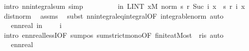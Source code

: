 \begin{isabellebody}
\ {\isacharparenleft}{\kern0pt}intro\ nn{\isacharunderscore}{\kern0pt}integral{\isacharunderscore}{\kern0pt}sum{\isacharcomma}{\kern0pt}\ simp{\isacharparenright}{\kern0pt}\isanewline
\ \ \ \ \isamarkupfalse%
\ \isamarkupfalse%
\ {\isachardoublequoteopen}{\isachardot}{\kern0pt}{\isachardot}{\kern0pt}{\isachardot}{\kern0pt}\ {\isacharequal}{\kern0pt}\ {\isacharparenleft}{\kern0pt}{\isasymSum}i{\isasymle}n{\isachardot}{\kern0pt}\ LINT\ x{\isacharbar}{\kern0pt}M{\isachardot}{\kern0pt}\ norm\ {\isacharparenleft}{\kern0pt}s\ {\isacharparenleft}{\kern0pt}r\ {\isacharparenleft}{\kern0pt}Suc\ i{\isacharparenright}{\kern0pt}{\isacharparenright}{\kern0pt}\ x\ {\isacharminus}{\kern0pt}\ s\ {\isacharparenleft}{\kern0pt}r\ i{\isacharparenright}{\kern0pt}\ x{\isacharparenright}{\kern0pt}{\isacharparenright}{\kern0pt}{\isachardoublequoteclose}\ \isamarkupfalse%
\ dist{\isacharunderscore}{\kern0pt}norm\ \isamarkupfalse%
\ assms{\isacharparenleft}{\kern0pt}{}{\isacharparenright}{\kern0pt}\ \isamarkupfalse%
\ {\isacharparenleft}{\kern0pt}subst\ nn{\isacharunderscore}{\kern0pt}integral{\isacharunderscore}{\kern0pt}eq{\isacharunderscore}{\kern0pt}integral{\isacharbrackleft}{\kern0pt}OF\ integrable{\isacharunderscore}{\kern0pt}norm{\isacharbrackright}{\kern0pt}{\isacharcomma}{\kern0pt}\ auto{\isacharparenright}{\kern0pt}\isanewline
\ \ \ \ \isamarkupfalse%
\ \isamarkupfalse%
\ {\isachardoublequoteopen}{\isachardot}{\kern0pt}{\isachardot}{\kern0pt}{\isachardot}{\kern0pt}\ {\isacharless}{\kern0pt}\ ennreal\ {\isacharparenleft}{\kern0pt}{\isasymSum}i{\isasymle}n{\isachardot}{\kern0pt}\ {\isacharparenleft}{\kern0pt}{}\ {\isacharslash}{\kern0pt}\ {}{\isacharparenright}{\kern0pt}\ {\isacharcircum}{\kern0pt}\ i{\isacharparenright}{\kern0pt}{\isachardoublequoteclose}\ \isamarkupfalse%
\ {\isacharparenleft}{\kern0pt}intro\ ennreal{\isacharunderscore}{\kern0pt}lessI{\isacharbrackleft}{\kern0pt}OF\ sum{\isacharunderscore}{\kern0pt}pos\ sum{\isacharunderscore}{\kern0pt}strict{\isacharunderscore}{\kern0pt}mono{\isacharbrackleft}{\kern0pt}OF\ finite{\isacharunderscore}{\kern0pt}atMost\ {\isacharunderscore}{\kern0pt}\ r{\isacharunderscore}{\kern0pt}is{\isacharbrackright}{\kern0pt}{\isacharbrackright}{\kern0pt}{\isacharcomma}{\kern0pt}\ auto{\isacharparenright}{\kern0pt}\isanewline
\ \ \ \ \isamarkupfalse%
\ \isamarkupfalse%
\ {\isachardoublequoteopen}{\isachardot}{\kern0pt}{\isachardot}{\kern0pt}{\isachardot}{\kern0pt}\ {\isasymle}\ ennreal\ {}{\isachardoublequoteclose}\ \isamarkupfalse%

\end{isabellebody}
